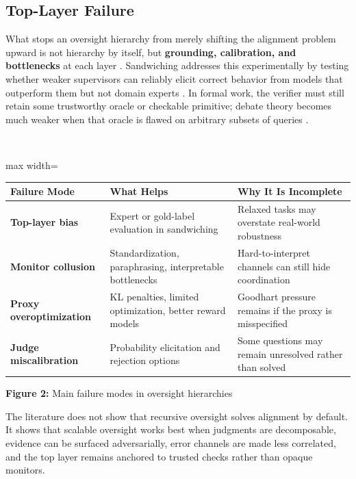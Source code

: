 \subsection*{Top-Layer Failure}


What stops an oversight hierarchy from merely shifting the alignment problem upward is not hierarchy by itself, but \textbf{grounding, calibration, and bottlenecks} at each layer  \cite{Bowman2022Measuring} \cite{Burns2023Weak-to-Strong} \cite{Engels2025Scaling}. Sandwiching addresses this experimentally by testing whether weaker supervisors can reliably elicit correct behavior from models that outperform them but not domain experts  \cite{Bowman2022Measuring} \cite{Recchia2025FindTheFlaws:}. In formal work, the verifier must still retain some trustworthy oracle or checkable primitive; debate theory becomes much weaker when that oracle is flawed on arbitrary subsets of queries  \cite{Brown-Cohen2023Scalable}.


\mbox{}\\
\begin{adjustbox}{max width=\textwidth}
\begin{tabular}{p{5.3cm} | p{5.3cm} | p{5.3cm}}
\hline
Failure Mode & What Helps & Why It Is Incomplete \\
\hline
\textbf{Top-layer bias} & Expert or gold-label evaluation in sandwiching  \cite{Bowman2022Measuring} & Relaxed tasks may overstate real-world robustness  \cite{Bowman2022Measuring} \\
\textbf{Monitor collusion} & Standardization, paraphrasing, interpretable bottlenecks  \cite{Greenblatt2023AI} & Hard-to-interpret channels can still hide coordination  \cite{Greenblatt2023AI} \\
\textbf{Proxy overoptimization} & KL penalties, limited optimization, better reward models  \cite{Gao2022Scaling} & Goodhart pressure remains if the proxy is misspecified  \cite{Gao2022Scaling} \\
\textbf{Judge miscalibration} & Probability elicitation and rejection options  \cite{Michael2023Debate} & Some questions may remain unresolved rather than solved  \cite{Michael2023Debate} \\
\hline
\end{tabular}
\end{adjustbox}


\textbf{Figure 2:} Main failure modes in oversight hierarchies


The literature does not show that recursive oversight solves alignment by default. It shows that scalable oversight works best when judgments are decomposable, evidence can be surfaced adversarially, error channels are made less correlated, and the top layer remains anchored to trusted checks rather than opaque monitors.




